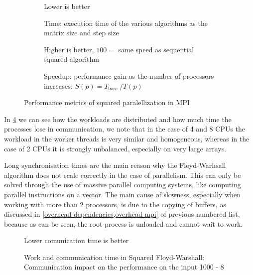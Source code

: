 \begin{figure}[htbp]
    \datatable

    \begin{subfigure}[t]{0.5\textwidth}
                
        \caption*{Lower is better}
        \caption{Time: execution time of the various algorithms as the matrix size and step size}
        \label{time}
    \end{subfigure}
    \begin{subfigure}[t]{0.5\textwidth}
        
        \caption*{Higher is better, \(100 =\) same speed as sequential squared algorithm}
        \caption{Speedup: performance gain as the number of
        processors increases: \( S ( p ) = T _ { \text {base } } / T ( p ) \)}
        \label{speedup}
    \end{subfigure}

    \caption{Performance metrics of squared paralellization in MPI}
    \label{performance-metrics}
\end{figure}

In \cref{work-and-communication-time} we can see how the workloads are distributed and how much time the processes lose in communication, we note that in the case of 4 and 8 CPUs the workload in the worker threads is very similar and homogeneous, whereas in the case of 2 CPUs it is strongly unbalanced, especially on very large arrays.

Long synchronisation times are the main reason why the Floyd-Warhsall algorithm does not scale correctly in the case of parallelism. This can only be solved through the use of massive parallel computing systems, like computing parallel instructions on a vector.
The main cause of slowness, especially when working with more than 2 processors, is due to the copying of buffers, as discussed in \cref{overhead-dependencies,overhead-mpi} of previous numbered list, because as can be seen, the root process is unloaded and cannot wait to work.

\begin{figure}[htbp]
    \datatable
        
        \caption*{Lower comunication time is better}

    \caption{Work and communication time in Squared Floyd-Warshall: Communication impact on the performance on the input 1000 - 8}
    \label{work-and-communication-time}
\end{figure}

